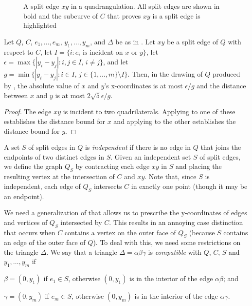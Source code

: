 \documentclass{patmorin}
\begin{document}
\begin{figure}
   \caption{A split edge $xy$ in a quadrangulation.  All split edges are shown in bold and the subcurve of $C$ that proves $xy$ is a split edge is highlighted}
\end{figure}

\begin{cor}
  Let $Q$, $C$, $e_1,\ldots,e_m$, $y_1,\ldots,y_m$, and $\Delta$
  be as in .  Let $xy$ be a split edge of $Q$ with
  respect to $C$, let $I=\{i:\text{$e_i$ is incident on $x$ or
  $y$}\}$, let $\epsilon=\max\{|y_i-y_j|:i,j\in I,\, i\neq j\}$, and
  let $g=\min\{|y_i-y_j|: i\in I,\, j\in\{1,\ldots,m\}\setminus I\}$.
  Then, in the drawing of $Q$ produced by , the absolute
  value of $x$ and $y$'s x-coordinates is at most $\epsilon/g$ and the
  distance between $x$ and $y$ is at most $2\sqrt{5}\epsilon/g$.
\end{cor}

\begin{proof}
   The edge $xy$ is incident to two quadrilaterals. Applying
    to one of these establishes the distance bound
   for $x$ and applying  to the other establishes
   the distance bound for $y$.
\end{proof}

A set $S$ of split edges in $Q$ is \emph{independent} if there is no
edge in $Q$ that joins the endpoints of two distinct edges in $S$.
Given an independent set $S$ of split edges, we define the graph $Q_S$
by contracting each edge $xy$ in $S$ and placing the resulting vertex at
the intersection of $C$ and $xy$.  Note that, since $S$ is independent,
each edge of $Q_S$ intersects $C$ in exactly one point (though it may
be an endpoint).

We need a generalization of  that allows us to prescribe
the y-coordinates of edges and vertices of $Q_S$ intersected by $C$.
This results in an annoying case distinction that occurs when $C$ contains
a vertex on the outer face of $Q_S$ (because $S$ contains an edge of the
outer face of $Q$).  To deal with this, we need some restrictions on the
triangle $\Delta$.  We say that a triangle $\Delta=\alpha\beta\gamma$
is \emph{compatible} with $Q$, $C$, $S$ and $y_1,\ldots,y_m$ if
\begin{compactenum}
  \item $\beta=(0,y_1)$ if $e_1\in S$, otherwise $(0,y_1)$ is in the interior
  of the edge $\alpha\beta$; and
  \item $\gamma=(0,y_m)$ if $e_m\in S$, otherwise $(0,y_m)$ is in the interior
  of the edge $\alpha\gamma$.
\end{compactenum}
\end{document}
